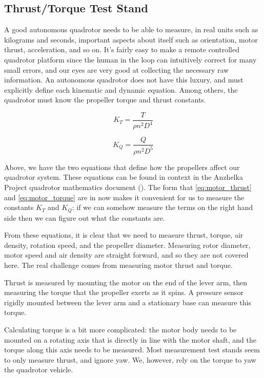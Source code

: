 \documentclass{article}
\numberwithin{equation}{section} %
\begin{document}
\subsection{Thrust/Torque Test Stand}

A good autonomous quadrotor needs to be able to measure, in real units such as kilograms and seconds, important aspects about itself such as orientation, motor thrust, acceleration, and so on. It's fairly easy to make a remote controlled quadrotor platform since the human in the loop can intuitively correct for many small errors, and our eyes are very good at collecting the necessary raw information. An autonomous quadrotor does not have this luxury, and must explicitly define each kinematic and dynamic equation. Among others, the quadrotor must know the propeller torque and thrust constants. 

\begin{equation} \label{eq:motor_thrust}
K_T = \frac{T}{\rho n^2 D^4}
\end{equation}

\begin{equation} \label{eq:motor_torque}
K_Q = \frac{Q}{\rho n^2 D^5}
\end{equation}

Above, we have the two equations that define how the propellers affect our quadrotor system. These equations can be found in context in the Anzhelka Project quadrotor mathematics document (\cite{anzhelka_math}). The form that \ref{eq:motor_thrust} and \ref{eq:motor_torque} are in now makes it convenient for us to measure the constants $K_T$ and $K_Q$: if we can somehow measure the terms on the right hand side then we can figure out what the constants are.

From these equations, it is clear that we need to measure thrust, torque, air density, rotation speed, and the propeller diameter. Measuring rotor diameter, motor speed and air density are straight forward, and so they are not covered here. The real challenge comes from measuring motor thrust and torque.

Thrust is measured by mounting the motor on the end of the lever arm, then measuring the torque that the propeller exerts as it spins. A pressure sensor rigidly mounted between the lever arm and a stationary base can measure this torque.

Calculating torque is a bit more complicated: the motor body needs to be mounted on a rotating axis that is directly in line with the motor shaft, and the torque along this axis needs to be measured. Most measurement test stands seem to only measure thrust, and ignore yaw. We, however, rely on the torque to yaw the quadrotor vehicle.
\end{document}

